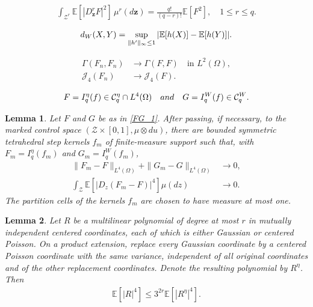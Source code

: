 \documentclass[10pt,a4paper]{amsart}
\newtheorem{lemma}{Lemma}
\newcommand{\AND}{\quad{\rm and}\quad}
\newcommand{\E}{\mathbb{E}}
\newcommand{\Gam}{\Gamma}
\newcommand{\Jfour}{\mathcal J_4}
\newcommand{\cC}{\mathcal{C}}
\newcommand{\cZ}{\mathcal{Z}}
\newcommand{\dW}{d_{\rm W}}
\newcommand{\dd}{d}
\newcommand{\noi}{\noindent}
\begin{document}
\begin{align}
 \int_{\cZ^r}\E[|D^r_{\boldsymbol z}F|^2]
 \,\mu^r(\dd\boldsymbol z)
 =\frac{q!}{(q-r)!}\E[F^2],
 \quad 1\leq r\leq q.
 \label{D_L2}
\end{align}

\begin{align}\label{def_dW}
 \dW(X,Y)
 =\sup_{\|h'\|_\infty\leq1}
 |\E[h(X)]-\E[h(Y)]|.
\end{align}

\begin{align}
 \Gam(F_n,F_n)&\longrightarrow\Gam(F,F)
 \quad\text{in }L^2(\Omega),
 \label{core_Gamma}\\
 \Jfour(F_n)&\longrightarrow\Jfour(F).
 \label{core_J4}
\end{align}

\begin{align}\label{FG_1}
 F=I_q^\eta(f)\in\cC_q^\eta\cap L^4(\Omega)
 \AND
 G=I_q^W(f)\in\cC_q^W.
\end{align}

\begin{lemma}
\label{lem_tetra_core}
Let $F$ and $G$ be as in \eqref{FG_1}.  After passing,
if necessary, to the marked control space
$(\cZ\times[0,1],\mu\otimes\dd u)$, there are bounded symmetric
tetrahedral step kernels $f_m$ of finite-measure support such that,
with $F_m=I_q^\eta(f_m)$ and $G_m=I_q^W(f_m)$,
\noi
\begin{align}
 \|F_m-F\|_{L^4(\Omega)}
 +\|G_m-G\|_{L^4(\Omega)}
 &\longrightarrow0,
 \label{tetra_L4}\\
 \int_\cZ\E[|D_z(F_m-F)|^4]\mu(\dd z)
 &\longrightarrow0.
 \label{tetra_D4}
\end{align}
The partition cells of the kernels $f_m$ are chosen to have measure at most one.
\end{lemma}

\begin{lemma}
\label{lem_hyb_4}
Let $R$ be a multilinear polynomial of degree at most $r$ in mutually
independent centered coordinates, each of which is either Gaussian or
centered Poisson.  On a product extension, replace every Gaussian
coordinate by a centered Poisson coordinate with the same variance,
independent of all original coordinates and of the other replacement
coordinates.  Denote the resulting polynomial by $R^\eta$.  Then
\noi
\begin{align}
 \E[|R|^4]\leq3^{2r}\E[|R^{\eta}|^4].
 \label{hyb_4}
\end{align}
\end{lemma}
\end{document}
